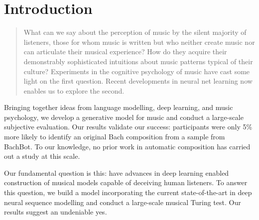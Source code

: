 \documentclass[dissertation.tex]{subfiles}
\begin{document}
\chapter{Introduction}




\begin{quote}
  What can we say about the perception of music by the silent majority of
  listeners, those for whom music is written but who neither create music nor
  can articulate their musical experience? How do they acquire their
  demonstrably sophisticated intuitions about music patterns
  typical of their culture? Experiments in the cognitive psychology of music
  have cast some light on the first question. Recent developments in neural net learning
  now enables us to explore the second.
\end{quote}\cite{bharucha1989modeling}

Bringing together ideas from language modelling, deep learning, and music
psychology, we develop a generative model for music and conduct a large-scale
subjective evaluation. Our results validate our success: participants were only
5\% more likely to identify an original Bach composition from a sample from
BachBot. To our knowledge, no prior work in automatic composition has carried
out a study at this scale.

Our fundamental question is this: have advances in deep learning enabled
construction of musical models capable of deceiving human listeners. To answer this
question, we build a model incorporating the current state-of-the-art in deep
neural sequence modelling and conduct a large-scale musical Turing test. Our
results suggest an undeniable yes.
\end{document}
